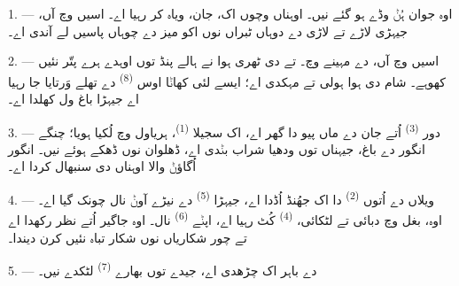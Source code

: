 %

\VUsaut{4.0mm}
\VUsaut{1.6mm}
\VUsaut{3.2mm}

\VUsaut{1.6mm}
\VUsaut{2.6mm}

\VUsaut{3.0mm}

1. --- اوہ جوان ہُݨ وڈے ہو گئے نیں۔ اوہناں وچوں اک، جان، ویاہ کر رہیا اے۔ اسیں
 وچ آں، جیہڑی لاڑے تے لاڑی دے دوہاں ٹبراں نوں اکو میز دے
چوہاں پاسیں لے آندی اے۔

2. --- اسیں  وچ آں،  دے مہینے وچ۔ 
تے  دی ٹھری ہوا نے ہالے پنڈ توں اوہدے ہرے پتّر نئیں کھوہے۔ شام
دی ہوا ہولی تے مہکدی اے؛ ایسے لئی کھاݨا اوس  \textsuperscript{(8)}
دے تھلے وَرتایا جا رہیا اے جیہڑا باغ ول کھلدا اے۔

3. --- دور  \textsuperscript{(3)} اُتے جان دے ماں پیو دا گھر اے، اک
سجیلا  \textsuperscript{(1)}، ہریاول وچ لُکیا ہویا؛ چنگے
انگور دے باغ، جیہناں توں ودھیا شراب بݨدی اے، ڈھلوان نوں ڈھکے ہوئے نیں۔ انگور
اُگاؤݨ والا اوہناں دی سنبھال کردا اے۔

4. --- ویلاں دے اُتوں  \textsuperscript{(2)} دا اک جھُنڈ اُڈدا اے،
جیہڑا  \textsuperscript{(5)} دے نیڑے آوݨ نال چونک گیا اے۔
اوہ، بغل وچ  دبائی تے  لٹکائی،
 \textsuperscript{(4)} کُٹ رہیا اے، اپݨے 
\textsuperscript{(6)} نال۔ اوہ جاگیر اُتے نظر رکھدا اے تے چور شکاریاں نوں شکار
تباہ نئیں کرن دیندا۔

5. ---  دے باہر اک  چڑھدی اے، جیدے توں
بھارے  \textsuperscript{(7)} لٹکدے نیں۔

